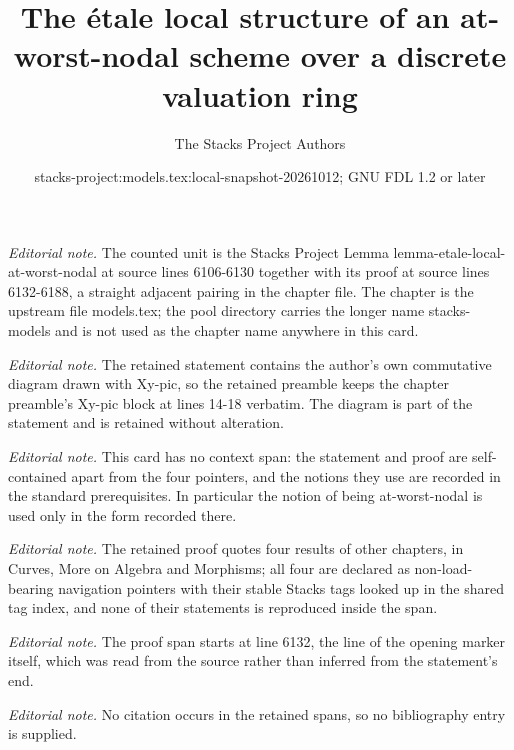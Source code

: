 \documentclass[10pt,a4paper]{amsart}
\title{The étale local structure of an at-worst-nodal scheme over a discrete valuation ring}
\author{The Stacks Project Authors}
\date{stacks-project:models.tex:local-snapshot-20261012; GNU FDL 1.2 or later}
\theoremstyle{plain}
\theoremstyle{definition}
\theoremstyle{remark}
\numberwithin{equation}{subsection}
\begin{document}
\maketitle
\noindent\textit{Editorial note.} The counted unit is the Stacks Project Lemma lemma-etale-local-at-worst-nodal at source lines 6106-6130 together with its proof at source lines 6132-6188, a straight adjacent pairing in the chapter file. The chapter is the upstream file models.tex; the pool directory carries the longer name stacks-models and is not used as the chapter name anywhere in this card.\par\medskip
\noindent\textit{Editorial note.} The retained statement contains the author's own commutative diagram drawn with Xy-pic, so the retained preamble keeps the chapter preamble's Xy-pic block at lines 14-18 verbatim. The diagram is part of the statement and is retained without alteration.\par\medskip
\noindent\textit{Editorial note.} This card has no context span: the statement and proof are self-contained apart from the four pointers, and the notions they use are recorded in the standard prerequisites. In particular the notion of being at-worst-nodal is used only in the form recorded there.\par\medskip
\noindent\textit{Editorial note.} The retained proof quotes four results of other chapters, in Curves, More on Algebra and Morphisms; all four are declared as non-load-bearing navigation pointers with their stable Stacks tags looked up in the shared tag index, and none of their statements is reproduced inside the span.\par\medskip
\noindent\textit{Editorial note.} The proof span starts at line 6132, the line of the opening marker itself, which was read from the source rather than inferred from the statement's end.\par\medskip
\noindent\textit{Editorial note.} No citation occurs in the retained spans, so no bibliography entry is supplied.\par\medskip
\end{document}
